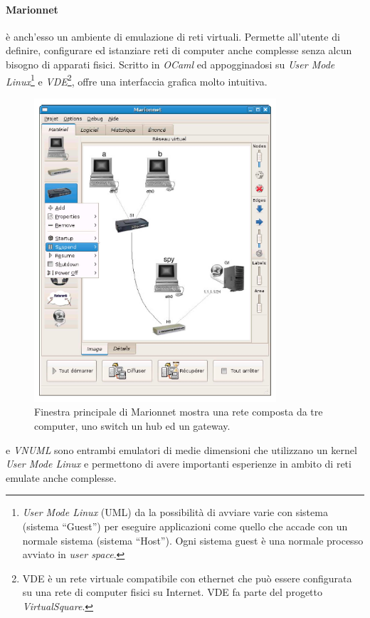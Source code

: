 \paragraph{Marionnet}\cite{MVNL08} è anch'esso un ambiente di emulazione di reti virtuali. Permette all'utente di definire, configurare ed istanziare reti di computer anche complesse senza alcun bisogno di apparati fisici. Scritto in \textit{OCaml} ed appogginadosi su \emph{User Mode Linux}\footnote{\emph{User Mode Linux} (UML) da la possibilità di avviare varie \virtualmachine{} con sistema \linux{} (sistema ``Guest'') per eseguire applicazioni come quello che accade con un normale sistema \linux{} (sistema ``Host''). Ogni sistema guest è una normale processo avviato in \emph{user space}.} e \textit{VDE}\footnote{VDE è un  rete virtuale compatibile con ethernet che può essere configurata su una rete di computer fisici su Internet. VDE fa parte del progetto \textit{VirtualSquare}.}, offre una interfaccia grafica molto intuitiva.
\begin{figure}[!ht]
	\centering
	\includegraphics[width=9cm]{images/marionnet_gui.png}
	\caption{Finestra principale di Marionnet mostra una rete composta da tre computer, uno switch un hub ed un gateway.}
	\label{figura:marionnet_gui}
\end{figure}

\netkit{}\cite{NETKIT}  e \emph{VNUML}\cite{VNUMLT} sono entrambi emulatori di medie dimensioni che utilizzano un kernel \emph{User Mode Linux} e permettono di avere importanti esperienze in ambito di reti emulate anche complesse.

